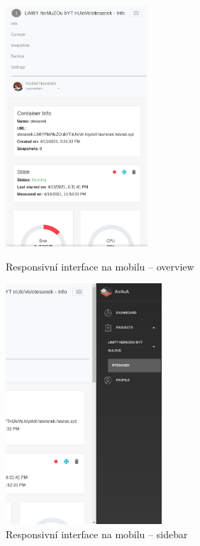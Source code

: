 \documentclass[a4paper,oneside,12pt]{report}
\begin{document}
\begin{figure}[!htb]
	\begin{minipage}{0.48\textwidth}
		\centering
		\includegraphics[height=9cm]{../img/navbarResponsiveSiderbarClosed.png}
		\caption[Responsivní interface na mobilu -- overview, vlastní tvorba]{Responsivní interface na mobilu -- overview}
		\label{fig:mobileResO}

	\end{minipage}\hfill
	\begin{minipage}{0.48\textwidth}
		\centering
		\includegraphics[height=9cm]{../img/navbarResponsiveSiderbarOpened.png}
		\caption[Responsivní interface na mobilu -- sidebar, vlastní tvorba]{Responsivní interface na mobilu -- sidebar}
		\label{fig:mobileResS}
	\end{minipage}
\end{figure}
\end{document}
